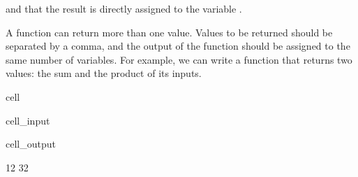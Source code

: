 \documentclass[letterpaper,10pt,english]{jupyterBook}
\begin{document}
\sphinxAtStartPar
and that the result is directly assigned to the variable .

\sphinxAtStartPar
A function can return more than one value. Values to be returned should be separated by a comma, and the output of the function should be assigned to the same number of variables. For example, we can write a function that returns two values: the sum and the product of its inputs.

\begin{sphinxuseclass}{cell}\begin{sphinxVerbatimInput}

\begin{sphinxuseclass}{cell_input}
\begin{sphinxVerbatim}[commandchars=\\\{\}]
  
        
        
               

        
\end{sphinxVerbatim}

\end{sphinxuseclass}\end{sphinxVerbatimInput}
\begin{sphinxVerbatimOutput}

\begin{sphinxuseclass}{cell_output}
\begin{sphinxVerbatim}[commandchars=\\\{\}]
12
32
\end{sphinxVerbatim}

\end{sphinxuseclass}\end{sphinxVerbatimOutput}

\end{sphinxuseclass}
\end{document}
